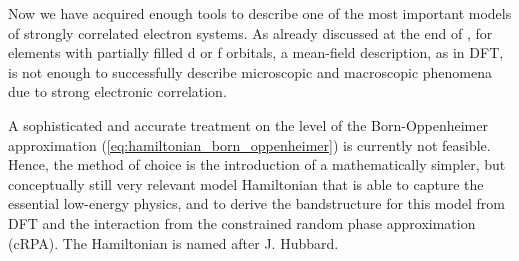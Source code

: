 \documentclass[../../main.tex]{subfiles}
\begin{document}
Now we have acquired enough tools to describe one of the most important models of strongly correlated electron systems. As already discussed at the end of , for elements with partially filled d or f orbitals, a mean-field description, as in DFT, is not enough to successfully describe microscopic and macroscopic phenomena due to strong electronic correlation. 

A sophisticated and accurate treatment on the level of the Born-Oppenheimer approximation (\eqref{eq:hamiltonian_born_oppenheimer}) is currently not feasible. Hence, the method of choice is the introduction of a mathematically simpler, but conceptually still very relevant model Hamiltonian that is able to capture the essential low-energy physics, and to derive the bandstructure for this model from DFT and the interaction from the constrained random phase approximation (cRPA). The Hamiltonian is named after J. Hubbard.
\end{document}
